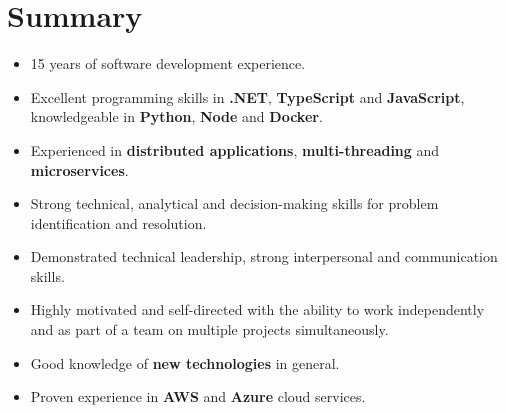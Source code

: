 \documentclass[11pt,a4paper,danish]{moderncv}        %
\begin{document}
\makecvtitle

\section{Summary}
\begin{itemize}
  \item	15 years of software development experience.
  \item Excellent programming skills in \textbf{.NET}, \textbf{TypeScript} and \textbf{JavaScript},
        knowledgeable in \textbf{Python}, \textbf{Node} and \textbf{Docker}.
  \item	Experienced in \textbf{distributed applications}, \textbf{multi-threading} and \textbf{microservices}.
  \item	Strong technical, analytical and decision-making skills for problem identification and resolution.
  \item	Demonstrated technical leadership, strong interpersonal and communication skills.
  \item	Highly motivated and self-directed with the ability to work independently and as part of a team on multiple projects simultaneously.
  \item	Good knowledge of \textbf{new technologies} in general.
  \item Proven experience in \textbf{AWS} and \textbf{Azure} cloud services.

\end{itemize}
\end{document}
